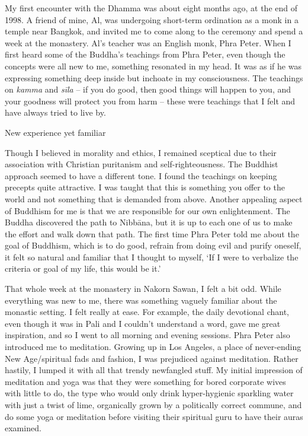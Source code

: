 
My first encounter with the Dhamma was about eight months ago, at the
end of 1998. A friend of mine, Al, was undergoing short-term ordination
as a monk in a temple near Bangkok, and invited me to come along to the
ceremony and spend a week at the monastery. Al's teacher was an English
monk, Phra Peter. When I first heard some of the Buddha's teachings from
Phra Peter, even though the concepts were all new to me, something
resonated in my head. It was as if he was expressing something deep
inside but inchoate in my consciousness. The teachings on \emph{kamma}
and \emph{sīla} -- if you do good, then good things will happen to you,
and your goodness will protect you from harm -- these were teachings
that I felt and have always tried to live by.

New experience yet familiar

Though I believed in morality and ethics, I remained sceptical due to
their association with Christian puritanism and self-righteousness. The
Buddhist approach seemed to have a different tone. I found the teachings
on keeping precepts quite attractive. I was taught that this is
something you offer to the world and not something that is demanded from
above. Another appealing aspect of Buddhism for me is that we are
responsible for our own enlightenment. The Buddha discovered the path to
Nibbāna, but it is up to each one of us to make the effort and walk down
that path. The first time Phra Peter told me about the goal of Buddhism,
which is to do good, refrain from doing evil and purify oneself, it felt
so natural and familiar that I thought to myself, `If I were to
verbalize the criteria or goal of my life, this would be it.'

That whole week at the monastery in Nakorn Sawan, I felt a bit odd.
While everything was new to me, there was something vaguely familiar
about the monastic setting. I felt really at ease. For example, the
daily devotional chant, even though it was in Pali and I couldn't
understand a word, gave me great inspiration, and so I went to all
morning and evening sessions. Phra Peter also introduced me to
meditation. Growing up in Los Angeles, a place of never-ending New
Age/spiritual fads and fashion, I was prejudiced against meditation.
Rather hastily, I lumped it with all that trendy newfangled stuff. My
initial impression of meditation and yoga was that they were something
for bored corporate wives with little to do, the type who would only
drink hyper-hygienic sparkling water with just a twist of lime,
organically grown by a politically correct commune, and do some yoga or
meditation before visiting their spiritual guru to have their auras
examined.

